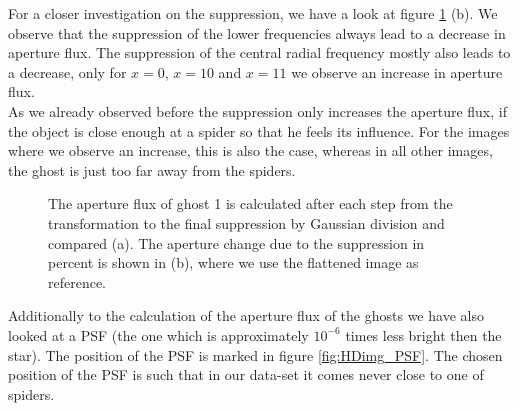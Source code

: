For a closer investigation on the suppression, we have a look at figure \ref{fig:Ghost1_apertures} (b). We observe that the suppression of the lower frequencies always lead to a decrease in aperture flux. The suppression of the central radial frequency mostly also leads to a decrease, only for $x=0$, $x=10$ and $x=11$ we observe an increase in aperture flux.\\
As we already observed before the suppression only increases the aperture flux, if the object is close enough at a spider so that he feels its influence. For the images where we observe an increase, this is also the case, whereas in all other images, the ghost is just too far away from the spiders.\\
\begin{figure}[H]
	\centering
\caption{The aperture flux of ghost 1 is calculated after each step from the transformation to the final suppression by Gaussian division and compared (a). The aperture change due to the suppression in percent is shown in (b), where we use the flattened image as reference.}
\label{fig:Ghost1_apertures}
\end{figure}
Additionally to the calculation of the aperture flux of the ghosts we have also looked at a PSF (the one which is approximately $10^{-6}$ times less bright then the star). The position of the PSF is marked in figure \ref{fig:HDimg_PSF}. The chosen position of the PSF is such that in our data-set it comes never close to one of spiders. 
